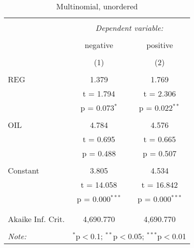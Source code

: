 
\begin{table}[!htbp] \centering 
  \caption{Multinomial, unordered} 
  \label{tbl:multinom} 
\begin{tabular}{@{\extracolsep{5pt}}lcc} 
\\[-1.8ex]\hline 
\hline \\[-1.8ex] 
 & \multicolumn{2}{c}{\textit{Dependent variable:}} \\ 
\cline{2-3} 
\\[-1.8ex] & negative & positive \\ 
\\[-1.8ex] & (1) & (2)\\ 
\hline \\[-1.8ex] 
 REG & 1.379 & 1.769 \\ 
  & t = 1.794 & t = 2.306 \\ 
  & p = 0.073$^{*}$ & p = 0.022$^{**}$ \\ 
  & & \\ 
 OIL & 4.784 & 4.576 \\ 
  & t = 0.695 & t = 0.665 \\ 
  & p = 0.488 & p = 0.507 \\ 
  & & \\ 
 Constant & 3.805 & 4.534 \\ 
  & t = 14.058 & t = 16.842 \\ 
  & p = 0.000$^{***}$ & p = 0.000$^{***}$ \\ 
  & & \\ 
\hline \\[-1.8ex] 
Akaike Inf. Crit. & 4,690.770 & 4,690.770 \\ 
\hline 
\hline \\[-1.8ex] 
\textit{Note:}  & \multicolumn{2}{r}{$^{*}$p$<$0.1; $^{**}$p$<$0.05; $^{***}$p$<$0.01} \\ 
\end{tabular} 
\end{table}  
